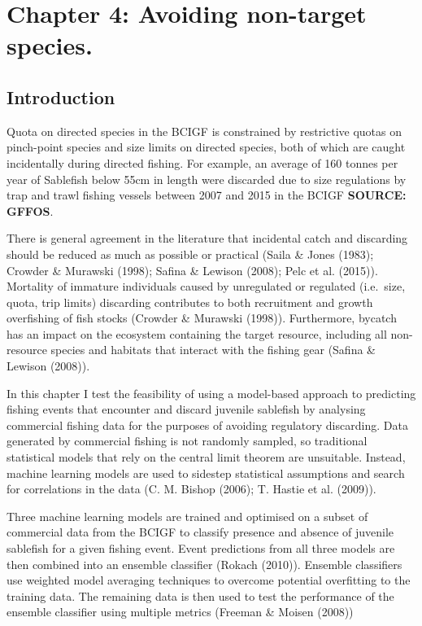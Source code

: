 \documentclass[12pt,]{scrartcl}
\begin{document}
\section{Chapter 4: Avoiding non-target
species.}\label{chapter-4-avoiding-non-target-species.}

\subsection{Introduction}\label{introduction-1}

Quota on directed species in the BCIGF is constrained by restrictive
quotas on pinch-point species and size limits on directed species, both
of which are caught incidentally during directed fishing. For example,
an average of 160 tonnes per year of Sablefish below 55cm in length were
discarded due to size regulations by trap and trawl fishing vessels
between 2007 and 2015 in the BCIGF \textbf{SOURCE: GFFOS}.

There is general agreement in the literature that incidental catch and
discarding should be reduced as much as possible or practical (Saila \&
Jones (1983); Crowder \& Murawski (1998); Safina \& Lewison (2008); Pelc
et al. (2015)). Mortality of immature individuals caused by unregulated
or regulated (i.e.~size, quota, trip limits) discarding contributes to
both recruitment and growth overfishing of fish stocks (Crowder \&
Murawski (1998)). Furthermore, bycatch has an impact on the ecosystem
containing the target resource, including all non-resource species and
habitats that interact with the fishing gear (Safina \& Lewison (2008)).

In this chapter I test the feasibility of using a model-based approach
to predicting fishing events that encounter and discard juvenile
sablefish by analysing commercial fishing data for the purposes of
avoiding regulatory discarding. Data generated by commercial fishing is
not randomly sampled, so traditional statistical models that rely on the
central limit theorem are unsuitable. Instead, machine learning models
are used to sidestep statistical assumptions and search for correlations
in the data (C. M. Bishop (2006); T. Hastie et al. (2009)).

Three machine learning models are trained and optimised on a subset of
commercial data from the BCIGF to classify presence and absence of
juvenile sablefish for a given fishing event. Event predictions from all
three models are then combined into an ensemble classifier (Rokach
(2010)). Ensemble classifiers use weighted model averaging techniques to
overcome potential overfitting to the training data. The remaining data
is then used to test the performance of the ensemble classifier using
multiple metrics (Freeman \& Moisen (2008))
\end{document}
